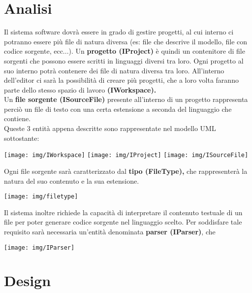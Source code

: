 \documentclass{article}
\begin{document}
  \section{Analisi}
  Il sistema software dovrà essere in grado di gestire progetti, al cui interno ci potranno essere più file di natura diversa (es: file che descrive il modello,
  file con codice sorgente, ecc...). Un \textbf{progetto (IProject)} è quindi un contenitore di file sorgenti che possono essere scritti in linguaggi diversi tra loro.
  Ogni progetto al suo interno potrà contenere dei file di natura diversa tra loro. All'interno dell'editor ci sarà la possibilità di creare più progetti,
  che a loro volta faranno parte dello stesso spazio di lavoro \textbf{(IWorkspace).}\\
  Un \textbf{file sorgente (ISourceFile)} presente all'interno di un progetto rappresenta perciò un file di testo con una certa estensione a seconda del linguaggio che contiene.\\
  Queste 3 entità appena descritte sono rappresentate nel modello UML sottostante:
  \begin{center}
    \texttt{[image: img/IWorkspace]}
    \texttt{[image: img/IProject]}
    \texttt{[image: img/ISourceFile]}
  \end{center}
  Ogni file sorgente sarà caratterizzato dal \textbf{tipo (FileType),} che rappresenterà la natura del suo contenuto e la sua estensione.
  \begin{center}
    \texttt{[image: img/filetype]}
  \end{center}
  Il sistema inoltre richiede la capacità di interpretare il contenuto testuale di un file per poter generare codice sorgente nel linguaggio scelto.
  Per soddisfare tale requisito sarà necessaria un'entità denominata \textbf{parser (IParser)}, che
  \begin{center}
    \texttt{[image: img/IParser]}
  \end{center}




  \section{Design}
\end{document}
